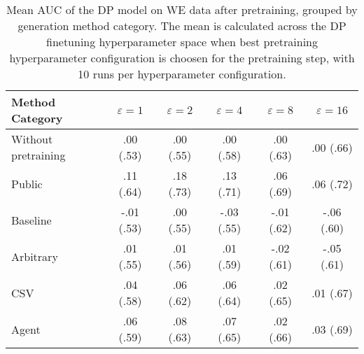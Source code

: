 \begin{table}[h!]
    \centering
    \caption{Mean AUC of the DP model on WE data after pretraining, grouped by generation method category. The mean is calculated across the DP finetuning hyperparameter space when best pretraining hyperparameter configuration is choosen for the pretraining step, with 10 runs per hyperparameter configuration.}
    \label{tab:epsilon_comparison}
    \begin{tabular}{lccccc}
    \toprule
    Method Category & $\varepsilon=1$ & $\varepsilon=2$ & $\varepsilon=4$ & $\varepsilon=8$ & $\varepsilon=16$ \\
    \midrule
    Without pretraining & .00 {\small (.53)} & .00 {\small (.55)} & .00 {\small (.58)} & .00 {\small (.63)} & .00 {\small (.66)} \\
    \arrayrulecolor{black!50!}\midrule
    Public & \cellcolor{gold!30}.11 {\small (.64)} & \cellcolor{gold!30}.18 {\small (.73)} & \cellcolor{gold!30}.13 {\small (.71)} & \cellcolor{gold!30}.06 {\small (.69)} & \cellcolor{gold!30}.06 {\small (.72)} \\
    \arrayrulecolor{black!50!}\midrule
    Baseline & -.01 {\small (.53)} & .00 {\small (.55)} & -.03 {\small (.55)} & -.01 {\small (.62)} & -.06 {\small (.60)} \\
    \arrayrulecolor{black!50!}\midrule
    Arbitrary & .01 {\small (.55)} & .01 {\small (.56)} & .01 {\small (.59)} & -.02 {\small (.61)} & -.05 {\small (.61)} \\
    \arrayrulecolor{black!50!}\midrule
    CSV & \cellcolor{bronze!30}.04 {\small (.58)} & \cellcolor{bronze!30}.06 {\small (.62)} & \cellcolor{bronze!30}.06 {\small (.64)} & \cellcolor{bronze!30}.02 {\small (.65)} & \cellcolor{bronze!30}.01 {\small (.67)} \\
    Agent & \cellcolor{silver!30}.06 {\small (.59)} & \cellcolor{silver!30}.08 {\small (.63)} & \cellcolor{silver!30}.07 {\small (.65)} & \cellcolor{silver!30}.02 {\small (.66)} & \cellcolor{silver!30}.03 {\small (.69)} \\
    \bottomrule
    \end{tabular}
\end{table}